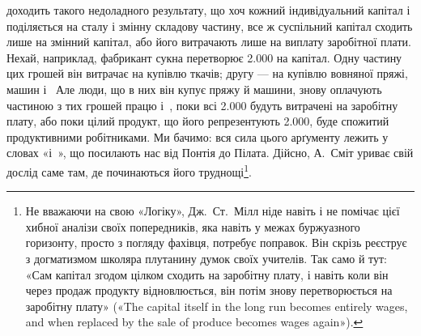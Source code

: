 доходить такого недоладного результату, що хоч кожний індивідуальний
капітал і поділяється на сталу і змінну складову
частину, все ж суспільний капітал сходить лише на змінний
капітал, або його витрачають лише на виплату заробітної плати.
Нехай, наприклад, фабрикант сукна перетворює \num{2.000}
на капітал. Одну частину цих грошей він витрачає на купівлю
ткачів; другу — на купівлю вовняної пряжі, машин і~
Але люди, що в них він купує пряжу й машини, знову оплачують
частиною з тих грошей працю і~, поки всі \num{2.000}
будуть витрачені на заробітну плату, або поки
цілий продукт, що його репрезентують \num{2.000},
буде спожитий продуктивними робітниками. Ми бачимо: вся
сила цього арґументу лежить у словах «і~», що посилають
нас від Понтія до Пілата. Дійсно, А.~Сміт уриває свій дослід
саме там, де починаються його труднощі\footnote{
Не вважаючи на свою «Логіку», Дж.~Ст.~Мілл ніде навіть і не
помічає цієї хибної аналізи своїх попередників, яка навіть у межах буржуазного
горизонту, просто з погляду фахівця, потребує поправок. Він
скрізь реєструє з догматизмом школяра плутанину думок своїх учителів.
Так само й тут: «Сам капітал згодом цілком сходить на заробітну плату,
і навіть коли він через продаж продукту відновлюється, він потім знову
перетворюється на заробітну плату» («The capital itself in the long run
becomes entirely wages, and when replaced by the sale of produce becomes
wages again»).
}.

